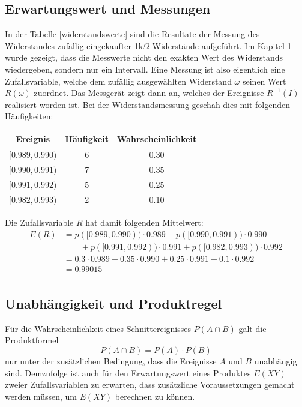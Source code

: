 \subsection{Erwartungswert und Messungen} \label{erwartungswertvonmesswerten}
In der Tabelle \ref{widerstandswerte} sind die Resultate der Messung des
Widerstandes zufällig eingekaufter 1k$\Omega$-Widerstände aufgeführt.
Im Kapitel 1 wurde gezeigt, dass die Mess\-werte nicht den exakten Wert
des Widerstands wiedergeben, sondern nur ein Intervall.
Eine Messung ist
also eigentlich eine Zufallsvariable, welche dem zufällig ausgewählten
Widerstand $\omega$ seinen Wert $R(\omega)$ zuordnet.
Das Messgerät zeigt
dann an, welches der Ereignisse $R^{-1}(I)$ realisiert worden ist.
Bei der Widerstandsmessung geschah dies mit folgenden Häufigkeiten:
\begin{center}
\begin{tabular}{|c|c|c|}
\hline
Ereignis&Häufigkeit&Wahrscheinlichkeit\\
\hline
$[0.989,0.990)$&6&0.30\\
$[0.990,0.991)$&7&0.35\\
$[0.991,0.992)$&5&0.25\\
$[0.982,0.993)$&2&0.10\\
\hline
\end{tabular}
\end{center}
Die Zufallsvariable $R$ hat damit folgenden Mittelwert:
\begin{align*}
E(R)&=p([0.989,0.990))\cdot 0.989+
p([0.990,0.991))\cdot 0.990\\
&\qquad  +
p([0.991,0.992))\cdot 0.991+
p([0.982,0.993))\cdot 0.992\\
&=
0.3\cdot 0.989+
0.35\cdot 0.990+
0.25\cdot 0.991+
0.1\cdot 0.992\\
&=0.99015\\
\end{align*}

\subsection{Unabhängigkeit und Produktregel}
Für die Wahrscheinlichkeit eines Schnittereignisses $P(A\cap B)$ galt die
Produktformel
\[
P(A\cap B)=P(A)\cdot P(B)
\]
nur unter der zusätzlichen Bedingung, dass die Ereignisse $A$ und $B$
unabhängig sind.
Demzufolge ist auch für den Erwartungswert eines
Produktes $E(XY)$ zweier Zufallsvariablen zu erwarten, dass zusätzliche
Voraussetzungen gemacht werden müssen, um $E(XY)$ berechnen zu können.

